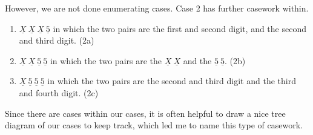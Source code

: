 However, we are not done enumerating cases. Case 2 has further casework within.
\begin{enumerate}[label=2\alph*]
    \item $\underline{X} ~ \underline{X} ~ \underline{X} ~ \underline{5}$ in which the two pairs are the first and second digit, and the second and third digit. (2a)
    \item  $\underline{X} ~ \underline{X} ~ \underline{5} ~ \underline{5}$ in which the two pairs are the $\underline{X} ~ \underline{X}$ and the $\underline{5} ~ \underline{5}$. (2b)
    \item $\underline{X} ~ \underline{5} ~ \underline{5} ~ \underline{5}$ in which the two pairs are the second and third digit and the third and fourth digit. (2c)
\end{enumerate}

Since there are cases within our cases, it is often helpful to draw a nice tree diagram of our cases to keep track, which led me to name this type of casework. 

